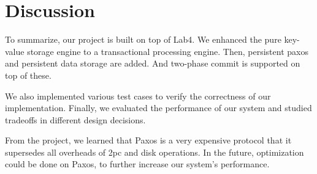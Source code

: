 \documentclass{vldb}
\begin{document}
\section{Discussion}

To summarize, our project is built on top of Lab4. We enhanced the 
pure key-value storage engine to a transactional processing engine.
Then, persistent paxos and persistent data storage are added. And 
two-phase commit is supported on top of these. 

We also implemented various test cases to verify the correctness of 
our implementation. Finally, we evaluated the performance of our 
system and studied tradeoffs in different design decisions.

From the project, we learned that Paxos is a very expensive protocol that it
supersedes all overheads of 2pc and disk operations. In the future, optimization could
be done on Paxos, to further increase our system's performance.




\end{document}
